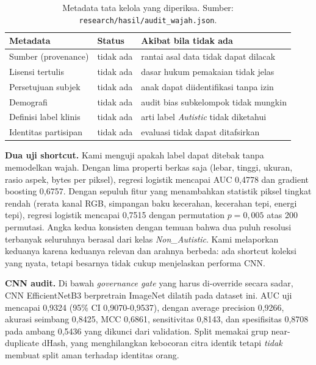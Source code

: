 \documentclass{article}
\begin{document}
\begin{table}[h]
\centering
\caption{Metadata tata kelola yang diperiksa. Sumber: \texttt{research/hasil/audit\_wajah.json}.}
\label{tab:governance}
\small
\begin{tabular}{lll}
\hline
Metadata & Status & Akibat bila tidak ada \\
\hline
Sumber (provenance)        & tidak ada & rantai asal data tidak dapat dilacak \\
Lisensi tertulis           & tidak ada & dasar hukum pemakaian tidak jelas \\
Persetujuan subjek         & tidak ada & anak dapat diidentifikasi tanpa izin \\
Demografi                  & tidak ada & audit bias subkelompok tidak mungkin \\
Definisi label klinis      & tidak ada & arti label \emph{Autistic} tidak diketahui \\
Identitas partisipan       & tidak ada & evaluasi tidak dapat ditafsirkan \\
\hline
\end{tabular}
\end{table}

\textbf{Dua uji shortcut.} Kami menguji apakah label dapat ditebak tanpa memodelkan wajah.
Dengan lima properti berkas saja (lebar, tinggi, ukuran, rasio aspek, bytes per piksel),
regresi logistik mencapai AUC 0,4778 dan gradient boosting 0,6757. Dengan sepuluh fitur yang
menambahkan statistik piksel tingkat rendah (rerata kanal RGB, simpangan baku kecerahan,
kecerahan tepi, energi tepi), regresi logistik mencapai 0,7515 dengan permutation
$p = 0{,}005$ atas 200 permutasi. Angka kedua konsisten dengan temuan bahwa dua puluh
resolusi terbanyak seluruhnya berasal dari kelas \emph{Non\_Autistic}. Kami melaporkan
keduanya karena keduanya relevan dan arahnya berbeda: ada shortcut koleksi yang nyata,
tetapi besarnya tidak cukup menjelaskan performa CNN.

\textbf{CNN audit.} Di bawah \emph{governance gate} yang harus di-override secara sadar, CNN
EfficientNetB3 berpretrain ImageNet dilatih pada dataset ini. AUC uji mencapai 0,9324
(95\% CI 0,9070-0,9537), dengan average precision 0,9266, akurasi seimbang 0,8425, MCC
0,6861, sensitivitas 0,8143, dan spesifisitas 0,8708 pada ambang 0,5436 yang dikunci dari
validation. Split memakai grup near-duplicate dHash, yang menghilangkan kebocoran citra
identik tetapi \emph{tidak} membuat split aman terhadap identitas orang.
\end{document}
